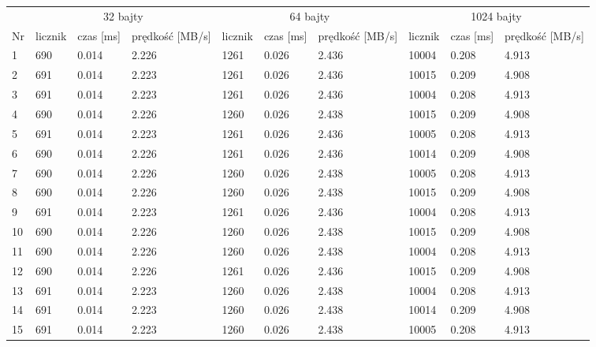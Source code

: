 \documentclass[oneside]{mgr}
\begin{document}
\begin{table}
\centering
        \begin{tabularx}{\linewidth + 1}{|X|X|X|X|X|X|X|X|X|X|}
        \hline 
         & \multicolumn{3}{|c|}{32 bajty} & \multicolumn{3}{|c|}{64 bajty} & \multicolumn{3}{|c|}{1024 bajty} \\
        \cline{2-10}
{\fontsize{10}{12}\selectfont Nr} & {\fontsize{10}{12}\selectfont licznik} &  {\fontsize{10}{12}\selectfont czas [ms]} & {\fontsize{10}{12}\selectfont prędkość [MB/s]} & {\fontsize{10}{12}\selectfont licznik} & {\fontsize{10}{12}\selectfont czas [ms]} &{\fontsize{10}{12}\selectfont prędkość [MB/s]} & {\fontsize{10}{12}\selectfont licznik} &{\fontsize{10}{12}\selectfont czas [ms]} &{\fontsize{10}{12}\selectfont prędkość [MB/s]} \\
            \hline
1	& 690 &	0.014 &	2.226 &	1261 &	0.026 &	2.436 &	10004 &	0.208 &	4.913 \\
\hline
2 &	691	& 0.014	& 2.223 &	1261 &	0.026 &	2.436 &	10015 &	0.209 &	4.908 \\ \hline
3 &	691	& 0.014	& 2.223 &	1261 &	0.026 &	2.436 &	10004 &	0.208 &	4.913 \\ \hline
4 &	690	& 0.014	& 2.226 &	1260 &	0.026 &	2.438 &	10015 &	0.209 &	4.908 \\ \hline
5 &	691	& 0.014	& 2.223 &	1261 &	0.026 &	2.436 &	10005 &	0.208 &	4.913 \\ \hline
6 &	690	& 0.014	& 2.226 &	1261 &	0.026 &	2.436 &	10014 &	0.209 &	4.908 \\ \hline
7 &	690	& 0.014	& 2.226 &	1260 &	0.026 &	2.438 &	10005 &	0.208 &	4.913 \\ \hline
8 &	690	& 0.014	& 2.226 &	1260 &	0.026 &	2.438 &	10015 &	0.209 &	4.908 \\ \hline
9 &	691	& 0.014	& 2.223 &	1261 &	0.026 &	2.436 &	10004 &	0.208 &	4.913 \\ \hline
10 &	690	& 0.014 &	2.226 &	1260 &	0.026 &	2.438 &	10015 &	0.209 &	4.908 \\ \hline
11 &	690	& 0.014 &	2.226 &	1260 &	0.026 &	2.438 &	10004 &	0.208 &	4.913 \\ \hline
12 &	690	& 0.014 &	2.226 &	1261 &	0.026 &	2.436 &	10015 &	0.209 &	4.908 \\ \hline
13 &	691	& 0.014 &	2.223 &	1260 &	0.026 &	2.438 &	10004 &	0.208 &	4.913 \\ \hline
14 &	691	& 0.014 &	2.223 &	1260 &	0.026 &	2.438 &	10014 &	0.209 &	4.908 \\ \hline
15 &	691	& 0.014 &	2.223 &	1260 &	0.026 &	2.438 &	10005 &	0.208 &	4.913 \\ \hline

\end{tabularx}
\end{table}
\end{document}
